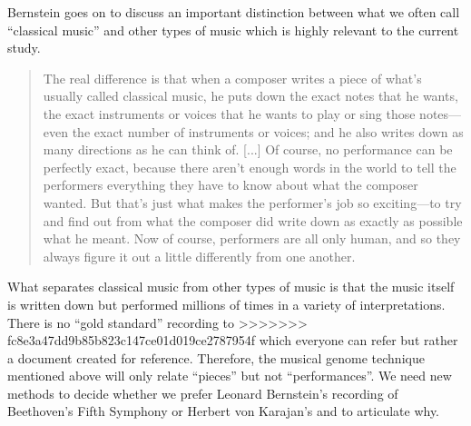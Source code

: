 \documentclass[aoas]{imsart}
\begin{document}
Bernstein goes on to discuss an important distinction between what
we often call ``classical music'' and other types of music which is
highly relevant to the current study.
\begin{quote}
  The real difference is that when a composer
  writes a piece of what's usually called classical music, he puts down
  the exact notes that he wants, the exact instruments or voices that he
  wants to play or sing those notes---even the exact number of
  instruments or voices; and he also writes down as many directions as
  he can think of. [...] Of course, no performance can be perfectly exact, because there
  aren't enough words in the world to tell the performers everything
  they have to know about what the composer wanted. But that's just what
  makes the performer's job so exciting---to try and find out from what
  the composer did write down as exactly as possible what he meant. Now
  of course, performers are all only human, and so they always figure it
  out a little differently from one another.  
\end{quote}
What separates classical music from other types of music is that the
music itself is written down but performed millions of times in a
variety of interpretations. There is no ``gold standard'' recording to
>>>>>>> fc8e3a47dd9b85b823c147ce01d019ce2787954f
which everyone can refer but rather a document created for
reference. Therefore, the musical genome technique mentioned above
will only relate ``pieces'' but not ``performances''. We need
new methods to decide whether we prefer Leonard Bernstein's
recording of Beethoven's Fifth Symphony or Herbert von Karajan's and
to articulate why.
\end{document}
